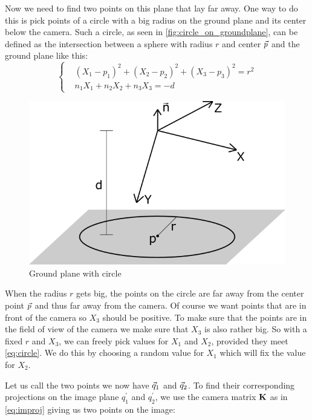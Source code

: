 Now we need to find two points on this plane that lay far away. One way to do this is pick points of a circle with a big radius on the ground plane and its center below the camera. Such a circle, as seen in \autoref{fig:circle_on_groundplane}, can be defined as the intersection between a sphere with radius $r$ and center $\vec p$ and the ground plane like this:
\begin{equation}\label{eq:circle}
    \left\{ \begin{array}{ll}
         & (X_1 - p_1)^{2} + (X_2 - p_2)^{2} + (X_3 - p_3)^{2} = r^{2} \\
         & n_1X_1 + n_2X_2 + n_3X_3 = -d
    \end{array} \right.
\end{equation}

\begin{figure}
    \centering
    \includegraphics[width=1\textwidth]{figures/plane_with_circle.png}
    \caption{Ground plane with circle}
    \label{fig:circle_on_groundplane}
\end{figure}
When the radius $r$ gets big, the points on the circle are far away from the center point $\vec p$ and thus far away from the camera. Of course we want points that are in front of the camera so $X_3$ should be positive. To make sure that the points are in the field of view of the camera we make sure that $X_3$ is also rather big. So with a fixed $r$ and $X_3$, we can freely pick values for $X_1$ and $X_2$, provided they meet \autoref{eq:circle}. We do this by choosing a random value for $X_1$ which will fix the value for $X_2$.\bigskip

Let us call the two points we now have $\vec q_1$ and $\vec q_2$. To find their corresponding projections on the image plane $q_{1}^{'}$ and $q_{2}^{'}$, we use the camera matrix $\mathbf{K}$ as in \autoref{eq:improj} giving us two points on the image:


